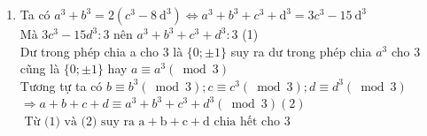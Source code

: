 \begin{bt}
{\begin{enumerate}
            Vậy P nguyên
            \item Ta có $a^3+b^3=2\left(c^3-8 \mathrm{~d}^3\right) \Leftrightarrow a^3+b^3+c^3+\mathrm{d}^3=3 c^3-15 \mathrm{~d}^3$\\[5px]
            Mà $3 c^3-15 d^3: 3$ nên $a^3+b^3+c^3+d^3: 3$ (1)\\[5px]
            Dư trong phép chia a cho 3 là $\{0 ; \pm 1\}$ suy ra dư trong phép chia $a^3$ cho 3 cũng là $\{0 ; \pm 1\}$ hay $a \equiv a^3(\bmod 3)$\\[5px]
            Tương tự ta có $b \equiv b^3(\bmod 3) ; c \equiv c^3(\bmod 3) ; d \equiv d^3(\bmod 3)$\\[5px]
            $\Rightarrow a+b+c+d \equiv a^3+b^3+c^3+d^3(\bmod 3)(2)$\\[5px] 
            $\text { Từ (1) và (2) suy ra } \mathrm{a}+\mathrm{b}+\mathrm{c}+\mathrm{d} \text { chia hết cho } 3$
        \end{enumerate}
    }
\end{bt}


